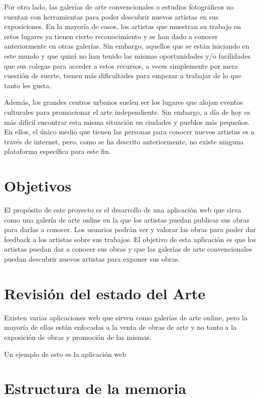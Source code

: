 Por otro lado, las galerías de arte convencionales o estudios fotográficos no cuentan con
herramientas para poder descubrir nuevos artistas en sus exposiciones. En la mayoría de casos,
los artistas que muestran su trabajo en estos lugares ya tienen cierto reconocimiento y se
han dado a conocer anteriormente en otras galerías. Sin embargo, aquellos que se están
iniciando en este mundo y que quizá no han tenido las mismas oportunidades y/o facilidades
que sus colegas para acceder a estos recursos, a veces simplemente por mera cuestión de
suerte, tienen más dificultades para empezar a trabajar de lo que tanto les gusta.  

Además, los grandes centros urbanos suelen ser los lugares que alojan eventos culturales para
promocionar el arte independiente. Sin embargo, a día de hoy es más difícil encontrar esta
misma situación en ciudades y pueblos más pequeños. En ellos, el único medio que tienen las
personas para conocer nuevos artistas es a través de internet, pero, como se ha descrito
anteriormente, no existe ninguna plataforma específica para este fin.

\section{Objetivos}

El propósito de este proyecto es el desarrollo de una aplicación web que sirva como una
galería de arte online en la que los artistas puedan publicar sus obras para darlas a
conocer. Los usuarios podrán ver y valorar las obras para poder dar feedback a los
artistas sobre sus trabajos. El objetivo de esta aplicación es que los artistas puedan
dar a conocer sus obras y que las galerías de arte convencionales puedan descubrir nuevos
artistas para exponer sus obras.

\section{Revisión del estado del Arte}

Existen varias aplicaciones web que sirven como galerías de arte online, pero la mayoría
de ellas están enfocadas a la venta de obras de arte y no tanto a la exposición de obras
y promoción de las mismas.

Un ejemplo de esto es la aplicación web

\section{Estructura de la memoria}
